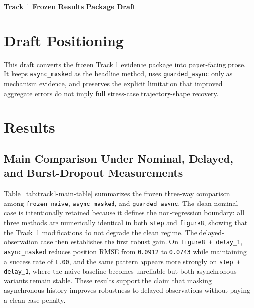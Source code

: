 \documentclass[12pt,a4paper]{article}
\begin{document}
\onehalfspacing

\begin{center}
    \textbf{\LARGE Track 1 Frozen Results Package Draft}
\end{center}

\vspace{1em}

\section*{Draft Positioning}

This draft converts the frozen Track 1 evidence package into paper-facing prose. It keeps \texttt{async\_masked} as the headline method, uses \texttt{guarded\_async} only as mechanism evidence, and preserves the explicit limitation that improved aggregate errors do not imply full stress-case trajectory-shape recovery.

\tableofcontents
\newpage

\section{Results}

\subsection{Main Comparison Under Nominal, Delayed, and Burst-Dropout Measurements}

Table~\ref{tab:track1-main-table} summarizes the frozen three-way comparison among \texttt{frozen\_naive}, \texttt{async\_masked}, and \texttt{guarded\_async}. The clean nominal case is intentionally retained because it defines the non-regression boundary: all three methods are numerically identical in both \texttt{step} and \texttt{figure8}, showing that the Track~1 modifications do not degrade the clean regime. The delayed-observation case then establishes the first robust gain. On \texttt{figure8 + delay\_1}, \texttt{async\_masked} reduces position RMSE from \texttt{0.0912} to \texttt{0.0743} while maintaining a success rate of \texttt{1.00}, and the same pattern appears more strongly on \texttt{step + delay\_1}, where the naive baseline becomes unreliable but both asynchronous variants remain stable. These results support the claim that masking asynchronous history improves robustness to delayed observations without paying a clean-case penalty.
\end{document}
